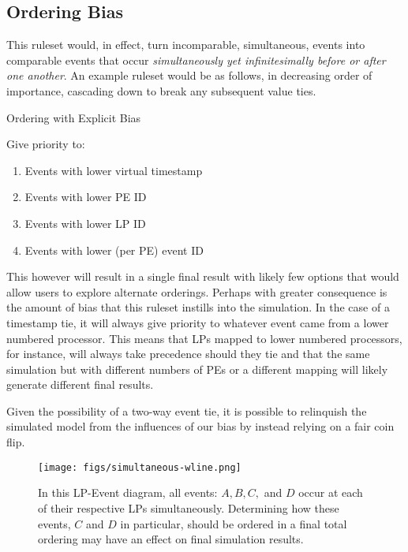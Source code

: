 \documentclass[nonacm,sigconf]{acmart}
\begin{document}
\subsection{Ordering Bias}
This ruleset would, in effect, turn incomparable, simultaneous, events into comparable events that occur \emph{simultaneously yet infinitesimally before or after one another}. An example ruleset would be as follows, in decreasing order of importance, cascading down to break any subsequent value ties.

\begin{ruleset}
\caption{Ordering with Explicit Bias}
\flushleft 
Give priority to:
\begin{enumerate}
  \item Events with lower virtual timestamp
  \item Events with lower PE ID
  \item Events with lower LP ID
  \item Events with lower (per PE) event ID
\end{enumerate}
\end{ruleset}

This however will result in a single final result with likely few options that would allow users to explore alternate orderings. Perhaps with greater consequence is the amount of bias that this ruleset instills into the simulation. In the case of a timestamp tie, it will always give priority to whatever event came from a lower numbered processor. This means that LPs mapped to lower numbered processors, for instance, will always take precedence should they tie and that the same simulation but with different numbers of PEs or a different mapping will likely generate different final results.

Given the possibility of a two-way event tie, it is possible to relinquish the simulated model from the influences of our bias by instead relying on a fair coin flip.

\begin{figure}[t]
  \centering
  \texttt{[image: figs/simultaneous-wline.png]}
  \caption{In this LP-Event diagram, all events: $A,B,C,$ and $D$ occur at each of their respective LPs simultaneously. Determining how these events, $C$ and $D$ in particular, should be ordered in a final total ordering may have an effect on final simulation results.}\label{fig:simultaneous}
\end{figure}
\end{document}
